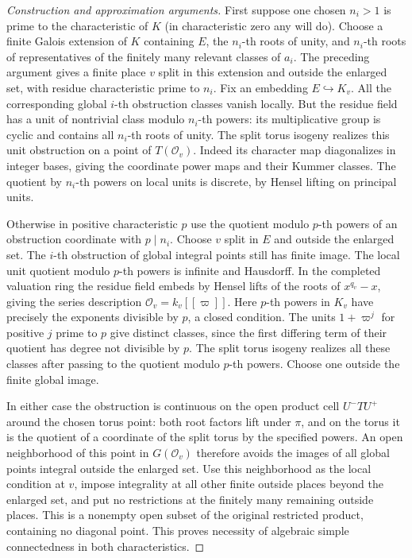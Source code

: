 \documentclass[11pt,a4paper,openany,oneside]{book}
\theoremstyle{resultstyle}
\theoremstyle{definition}
\numberwithin{equation}{chapter}
\newcommand{\OO}{\mathcal{O}}
\begin{document}
\begin{proof}[Construction and approximation arguments]
First suppose one chosen $n_i>1$ is prime to the
characteristic of $K$ (in characteristic zero any
will do). Choose a finite Galois extension of $K$
containing $E$, the $n_i$-th roots of unity, and
$n_i$-th roots of representatives of the finitely
many relevant classes of $a_i$. The preceding
argument gives a finite place $v$ split in this
extension and outside the enlarged set, with residue
characteristic prime to $n_i$. Fix an embedding
$E\hookrightarrow K_v$. All the corresponding
global $i$-th obstruction classes vanish locally.
But the residue field has a unit of nontrivial class
modulo $n_i$-th powers: its multiplicative group is
cyclic and contains all $n_i$-th roots of unity.
The split torus isogeny realizes this unit obstruction
on a point of $T(\OO_v)$. Indeed its character map
diagonalizes in integer bases, giving the coordinate
power maps and their Kummer classes. The quotient by
$n_i$-th powers on local units is discrete, by
Hensel lifting on principal units.

Otherwise in positive characteristic $p$ use the
quotient modulo $p$-th powers of an obstruction
coordinate with $p\mid n_i$. Choose $v$ split in $E$
and outside the enlarged set. The $i$-th obstruction
of global integral points still has finite image.
The local unit quotient modulo $p$-th powers is
infinite and Hausdorff. In the completed valuation
ring the residue field embeds by Hensel lifts of
the roots of $x^{q_v}-x$, giving the series
description $\OO_v=k_v[[\varpi]]$. Here $p$-th
powers in $K_v$ have precisely the exponents
divisible by $p$, a closed condition. The units
$1+\varpi^j$ for positive $j$ prime to $p$ give
distinct classes, since the first differing term
of their quotient has degree not divisible by $p$.
The split torus isogeny realizes all these classes
after passing to the quotient modulo $p$-th powers.
Choose one outside the finite global image.

In either case the obstruction is continuous on
the open product cell $U^-TU^+$ around the chosen
torus point: both root factors lift under $\pi$,
and on the torus it is the quotient of a coordinate
of the split torus by the specified powers. An open
neighborhood of this point in $G(\OO_v)$ therefore
avoids the images of all global points integral
outside the enlarged set. Use this neighborhood as
the local condition at $v$, impose integrality at
all other finite outside places beyond the enlarged
set, and put no restrictions at the finitely many
remaining outside places. This is a nonempty open
subset of the original restricted product, containing
no diagonal point. This proves necessity of algebraic
simple connectedness in both characteristics.


\end{proof}
\end{document}
